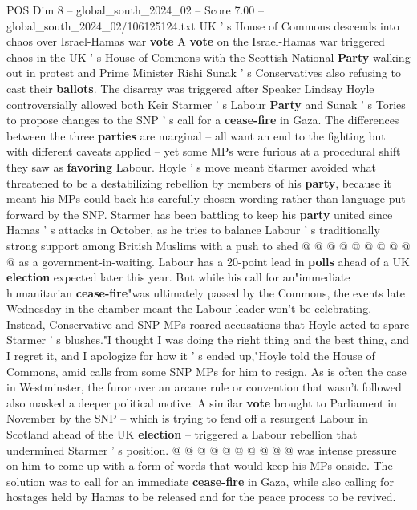 \begin{textsample}{POS Dim 8 – global\_south\_2024\_02 – Score 7.00 – global\_south\_2024\_02/106125124.txt}  \label{ex:f8_pos_200}
UK ' s House of Commons descends into chaos over Israel-Hamas war \textbf{vote} A \textbf{vote} on the Israel-Hamas war triggered chaos in the UK ' s House of Commons with the Scottish National \textbf{Party} walking out in protest and Prime Minister Rishi Sunak ' s Conservatives also refusing to cast their \textbf{ballots}.
The disarray was triggered after Speaker Lindsay Hoyle controversially allowed both Keir Starmer ' s Labour \textbf{Party} and Sunak ' s Tories to propose changes to the SNP ' s call for a \textbf{cease-fire} in Gaza.
The differences between the three \textbf{parties} are marginal -- all want an end to the fighting but with different caveats applied -- yet some MPs were furious at a procedural shift they saw as \textbf{favoring} Labour.
Hoyle ' s move meant Starmer avoided what threatened to be a destabilizing rebellion by members of his \textbf{party}, because it meant his MPs could back his carefully chosen wording rather than language put forward by the SNP.
Starmer has been battling to keep his \textbf{party} united since Hamas ' s attacks in October, as he tries to balance Labour ' s traditionally strong support among British Muslims with a push to shed @ @ @ @ @ @ @ @ @ @ as a government-in-waiting.
Labour has a 20-point lead in \textbf{polls} ahead of a UK \textbf{election} expected later this year.
But while his call for an"immediate humanitarian \textbf{cease-fire}"was ultimately passed by the Commons, the events late Wednesday in the chamber meant the Labour leader won't be celebrating.
Instead, Conservative and SNP MPs roared accusations that Hoyle acted to spare Starmer ' s blushes."I thought I was doing the right thing and the best thing, and I regret it, and I apologize for how it ' s ended up,"Hoyle told the House of Commons, amid calls from some SNP MPs for him to resign.
As is often the case in Westminster, the furor over an arcane rule or convention that wasn't followed also masked a deeper political motive.
A similar \textbf{vote} brought to Parliament in November by the SNP -- which is trying to fend off a resurgent Labour in Scotland ahead of the UK \textbf{election} -- triggered a Labour rebellion that undermined Starmer ' s position. @ @ @ @ @ @ @ @ @ @ was intense pressure on him to come up with a form of words that would keep his MPs onside.
The solution was to call for an immediate \textbf{cease-fire} in Gaza, while also calling for hostages held by Hamas to be released and for the peace process to be revived.

\end{textsample}
